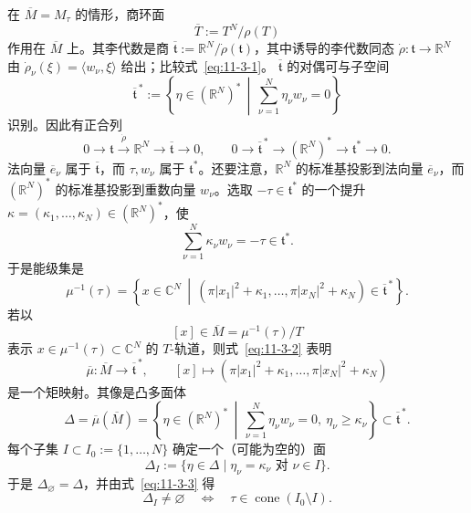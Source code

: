 在 $\overline M=M_\tau$ 的情形，商环面
\[
  \overline T:=T^N/\rho(T)
\]
作用在 $\overline M$ 上。其李代数是商
$\overline{\mathfrak t}:=\mathbb R^N/\dot\rho(\mathfrak t)$，其中诱导的李代数同态
$\dot\rho:\mathfrak t\to\mathbb R^N$ 由
$\dot\rho_\nu(\xi)=\langle w_\nu,\xi\rangle$ 给出；比较式~\eqref{eq:11-3-1}。
$\overline{\mathfrak t}$ 的对偶可与子空间
\begin{equation}\label{eq:11-3-11}
  \overline{\mathfrak t}^{\,*}:=
  \left\{\eta\in(\mathbb R^N)^*\,\middle|\,
  \sum_{\nu=1}^N\eta_\nu w_\nu=0\right\}
\end{equation}
识别。因此有正合列
\[
  0\longrightarrow\mathfrak t\xrightarrow{\dot\rho}\mathbb R^N
  \longrightarrow\overline{\mathfrak t}\longrightarrow0,
  \qquad
  0\longrightarrow\overline{\mathfrak t}^{\,*}\longrightarrow(\mathbb R^N)^*
  \longrightarrow\mathfrak t^*\longrightarrow0.
\]
法向量 $\overline e_\nu$ 属于 $\overline{\mathfrak t}$，而 $\tau,w_\nu$ 属于
$\mathfrak t^*$。还要注意，$\mathbb R^N$ 的标准基投影到法向量
$\overline e_\nu$，而 $(\mathbb R^N)^*$ 的标准基投影到重数向量 $w_\nu$。选取
$-\tau\in\mathfrak t^*$ 的一个提升
$\kappa=(\kappa_1,\ldots,\kappa_N)\in(\mathbb R^N)^*$，使
\[
  \sum_{\nu=1}^N\kappa_\nu w_\nu=-\tau\in\mathfrak t^*.
\]
于是能级集是
\[
  \mu^{-1}(\tau)=
  \left\{x\in\mathbb C^N\,\middle|\,
  (\pi|x_1|^2+\kappa_1,\ldots,\pi|x_N|^2+\kappa_N)
  \in\overline{\mathfrak t}^{\,*}\right\}.
\]
若以
\[
  [x]\in\overline M=\mu^{-1}(\tau)/T
\]
表示 $x\in\mu^{-1}(\tau)\subset\mathbb C^N$ 的 $T$-轨道，则式~\eqref{eq:11-3-2}
表明
\[
  \overline\mu:\overline M\longrightarrow\overline{\mathfrak t}^{\,*},
  \qquad
  [x]\longmapsto
  (\pi|x_1|^2+\kappa_1,\ldots,\pi|x_N|^2+\kappa_N)
\]
是一个矩映射。其像是凸多面体
\[
  \Delta=\overline\mu(\overline M)
  =\left\{\eta\in(\mathbb R^N)^*\,\middle|\,
  \sum_{\nu=1}^N\eta_\nu w_\nu=0,
  \ \eta_\nu\geq\kappa_\nu\right\}
  \subset\overline{\mathfrak t}^{\,*}.
\]
每个子集 $I\subset I_0:=\{1,\ldots,N\}$ 确定一个（可能为空的）面
\[
  \Delta_I:=\{\eta\in\Delta\mid\eta_\nu=\kappa_\nu
  \text{ 对 }\nu\in I\}.
\]
于是 $\Delta_\varnothing=\Delta$，并由式~\eqref{eq:11-3-3} 得
\begin{equation}\label{eq:11-3-12}
  \Delta_I\ne\varnothing
  \quad\Longleftrightarrow\quad
  \tau\in\operatorname{cone}(I_0\setminus I).
\end{equation}

